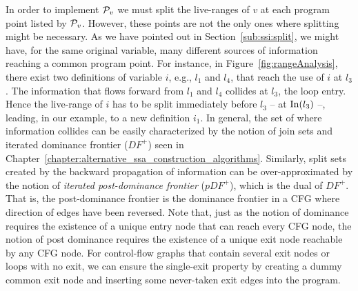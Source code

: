 {In order to implement ${\cal P}_v$ we must split the live-ranges of $v$ at each
program point listed by ${\cal P}_v$.
However, these points are not the only ones where splitting might be
necessary.
As we have pointed out in Section~\ref{sub:ssi:split}, we might have, for the same original variable, many different sources of information reaching a common program point.
For instance, in Figure~\ref{fig:rangeAnalysis}, there exist two definitions of variable $i$, e.g., $l_1$ and $l_4$, that reach the use of $i$ at $l_3$.
The information that flows forward from $l_1$ and $l_4$ collides at $l_3$, the loop entry.
Hence the live-range of $i$ has to be split immediately before $l_3$ -- at $\textrm{In}(l_3)$ --, leading,
in our example, to a new definition $i_1$.
In general, the set of \progpoints where information collides can be easily
characterized by the notion of join sets and iterated dominance frontier ($\textit{DF}^+$) seen in Chapter~\ref{chapter:alternative_ssa_construction_algorithms}.
Similarly, split sets created by the backward propagation of information can
be over-approximated by the notion of {\em iterated post-dominance
frontier} ($\textit{pDF}^+$), which is the dual of
$\textit{DF}^+$.
That is, the post-dominance frontier is the dominance frontier in a CFG where
direction of edges have been reversed. Note that, just as the notion of dominance requires the existence of a unique entry node that can reach every CFG node, the notion of post dominance requires the existence of a unique exit node reachable by any CFG node. For control-flow graphs that contain several exit nodes or loops with no exit, we can ensure the single-exit property by creating a dummy common exit node and inserting some never-taken exit edges into the program.

}
